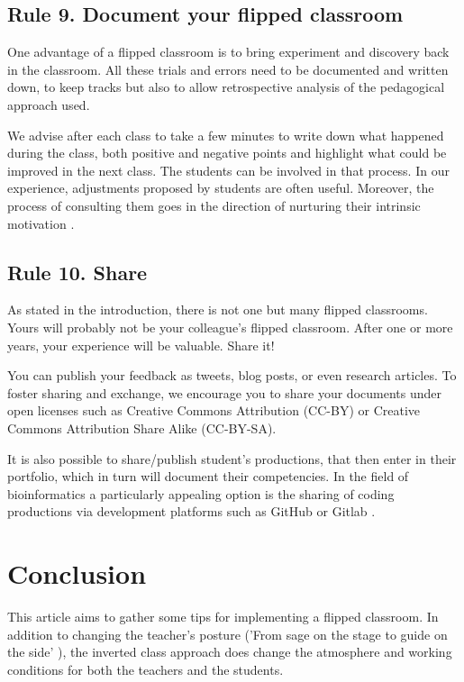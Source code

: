 \documentclass[10pt,letterpaper]{article}
\begin{document}
\subsection{Rule 9. Document your flipped classroom}

One advantage of a flipped classroom is to bring experiment and discovery back in the classroom. All these trials and errors 
need to be documented and written down, to keep tracks but also to allow retrospective analysis of the pedagogical approach used.

We advise after each class to take a few minutes to write down what happened during the class, both positive and negative points 
and highlight what could be improved in the next class. The students can be involved in that process. 
In our experience, adjustments proposed by students are often useful. Moreover, the process of consulting them goes 
in the direction of nurturing their intrinsic motivation \cite{oraif_university_2018,thai_impact_2017}.


\subsection{Rule 10. Share}

As stated in the introduction, there is not one but many flipped classrooms. Yours will probably not be your colleague's flipped
classroom. After one or more years, your experience will be valuable. Share it!

You can publish your feedback as tweets, blog posts, or even research articles. To foster sharing and exchange, 
we encourage you to share your documents under open licenses such as Creative Commons Attribution (CC-BY) or Creative Commons Attribution Share Alike (CC-BY-SA).

It is also possible to share/publish student's productions, that then enter in their portfolio, which in turn will document their competencies. 
In the field of bioinformatics a particularly appealing option is the sharing of coding productions via development platforms such as GitHub or Gitlab \cite{blischak_quick_2016,abdollahi2018meet}.


\section*{Conclusion}

This article aims to gather some tips for implementing a flipped classroom. In addition to changing 
the teacher's posture ('From sage on the stage to guide on the side' \cite{king_sage_1993}), 
the inverted class approach does change the atmosphere and working conditions for both the teachers 
and the students.
\end{document}
